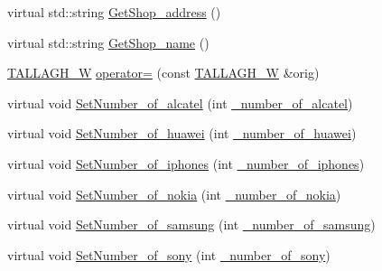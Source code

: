 \begin{DoxyCompactItemize}
\item 
virtual std\+::string \hyperlink{class_t_a_l_l_a_g_h___w_a591b5f445be4f3b636b415e7b614b82c_a591b5f445be4f3b636b415e7b614b82c}{Get\+Shop\+\_\+address} ()
\item 
virtual std\+::string \hyperlink{class_t_a_l_l_a_g_h___w_a3baca7e101bfde39d7a1bf91d99c4f51_a3baca7e101bfde39d7a1bf91d99c4f51}{Get\+Shop\+\_\+name} ()
\item 
\hyperlink{class_t_a_l_l_a_g_h___w}{T\+A\+L\+L\+A\+G\+H\+\_\+W} \hyperlink{class_t_a_l_l_a_g_h___w_a0ac3db0bae78cc4e59f175e90374ed50_a0ac3db0bae78cc4e59f175e90374ed50}{operator=} (const \hyperlink{class_t_a_l_l_a_g_h___w}{T\+A\+L\+L\+A\+G\+H\+\_\+W} \&orig)
\item 
virtual void \hyperlink{class_t_a_l_l_a_g_h___w_ad4a8e9cab71ab1b742298e630b6c32da_ad4a8e9cab71ab1b742298e630b6c32da}{Set\+Number\+\_\+of\+\_\+alcatel} (int \hyperlink{class_t_a_l_l_a_g_h___w_a034f2ba8c42c1b81ae947b15732e5881_a034f2ba8c42c1b81ae947b15732e5881}{\+\_\+number\+\_\+of\+\_\+alcatel})
\item 
virtual void \hyperlink{class_t_a_l_l_a_g_h___w_a94b6a0ce95c1edc5cd0bc195cbedc74f_a94b6a0ce95c1edc5cd0bc195cbedc74f}{Set\+Number\+\_\+of\+\_\+huawei} (int \hyperlink{class_t_a_l_l_a_g_h___w_ab966ff243f14eefc346e0b031f21c9b6_ab966ff243f14eefc346e0b031f21c9b6}{\+\_\+number\+\_\+of\+\_\+huawei})
\item 
virtual void \hyperlink{class_t_a_l_l_a_g_h___w_aba9c1573606adb336fd5e94969f2f8e8_aba9c1573606adb336fd5e94969f2f8e8}{Set\+Number\+\_\+of\+\_\+iphones} (int \hyperlink{class_t_a_l_l_a_g_h___w_ad8a7847f895cd13b45331e4f3cd20c2e_ad8a7847f895cd13b45331e4f3cd20c2e}{\+\_\+number\+\_\+of\+\_\+iphones})
\item 
virtual void \hyperlink{class_t_a_l_l_a_g_h___w_ae60d0ca1392d87afa206f98d5f1c59d1_ae60d0ca1392d87afa206f98d5f1c59d1}{Set\+Number\+\_\+of\+\_\+nokia} (int \hyperlink{class_t_a_l_l_a_g_h___w_aa095820dca65526e795d64f31a3aaec1_aa095820dca65526e795d64f31a3aaec1}{\+\_\+number\+\_\+of\+\_\+nokia})
\item 
virtual void \hyperlink{class_t_a_l_l_a_g_h___w_aec915c88a9cce504e58bf9481d897e7e_aec915c88a9cce504e58bf9481d897e7e}{Set\+Number\+\_\+of\+\_\+samsung} (int \hyperlink{class_t_a_l_l_a_g_h___w_a2438dbd2a390036bfd35f46a63b5b9bf_a2438dbd2a390036bfd35f46a63b5b9bf}{\+\_\+number\+\_\+of\+\_\+samsung})
\item 
virtual void \hyperlink{class_t_a_l_l_a_g_h___w_a700cbcd6355556eeaa33955e50010641_a700cbcd6355556eeaa33955e50010641}{Set\+Number\+\_\+of\+\_\+sony} (int \hyperlink{class_t_a_l_l_a_g_h___w_ab101d3ac8747eef48371cd9078d2366e_ab101d3ac8747eef48371cd9078d2366e}{\+\_\+number\+\_\+of\+\_\+sony})

\end{DoxyCompactItemize}
